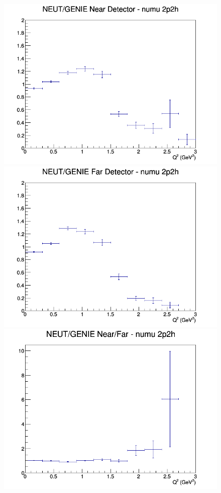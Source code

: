\begin{figure}[h]
\endminipage
\newline
{}
\includegraphics[width=\linewidth]{eff_Q2/GAr/ratios/2p2h_NEUT_GENIE_numu_near_Q2.png}
\endminipage
{}
\includegraphics[width=\linewidth]{eff_Q2/GAr/ratios/2p2h_NEUT_GENIE_numu_far_Q2.png}
\endminipage
{}
\includegraphics[width=\linewidth]{eff_Q2/GAr/ratios/2p2h_NEUT_GENIE_numu_NF_Q2.png}

\end{figure}
